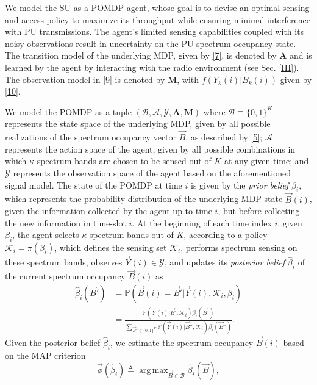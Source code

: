 \documentclass[10pt,twocolumn]{IEEEtran}
\DeclareMathOperator*{\argmax}{arg\,max}
\begin{document}
We model the SU as a POMDP agent, whose goal is to devise an optimal sensing and access policy to maximize its throughput while ensuring minimal interference with PU transmissions. The agent's limited sensing capabilities coupled with its noisy observations result in uncertainty on the PU spectrum occupancy state. The transition model of the underlying MDP, given by \eqref{7}, is denoted by $\mathbf{A}$ and is learned by the agent by interacting with the radio environment (see Sec. \ref{III}). The observation model in \eqref{9} is denoted by $\mathbf{M}$, with $f(Y_k(i)|B_k(i))$ given by \eqref{10}. 

We model the POMDP as a tuple $(\mathcal B,\mathcal{A},\mathcal{Y},\mathbf{A},\mathbf{M})$ where $\mathcal{B}{\equiv}\{0,1\}^K$ represents the state space of the underlying MDP, given by all possible realizations of the spectrum occupancy vector $\vec{B}$, as described by \eqref{5}; $\mathcal{A}$ represents the action space of the agent, given by all possible combinations in which $\kappa$ spectrum bands are chosen to be sensed out of $K$ at any given time; and $\mathcal{Y}$ represents the observation space of the agent based on the aforementioned signal model. The state of the POMDP at time $i$ is given by the \emph{prior belief} $\beta_i$, which represents the probability distribution of the underlying MDP state $\vec{B}(i)$, given the information collected by the agent up to time $i$, but before collecting the new information in time-slot $i$. At the beginning of each time index $i$, given $\beta_i$, the agent selects $\kappa$ spectrum bands out of $K$, according to a policy $\mathcal K_i{=}\pi(\beta_i)$, which defines the sensing set $\mathcal K_i$, performs spectrum sensing  on these spectrum bands, observes $\vec{Y}(i){\in} \mathcal{Y}$, and updates its \emph{posterior belief} $\hat{\beta}_i$ of the current spectrum occupancy $\vec{B}(i)$ as 
\begin{align}\label{11}
\nonumber
\hat\beta_i(\vec{B}') &= \mathbb{P}(\vec{B}(i) = \vec{B}'|\vec{Y}(i), \mathcal K_i, \beta_i)\\&=
\frac{\mathbb{P}(\vec{Y}(i)|\vec{B}', \mathcal{K}_i) \beta_i(\vec{B}')}{
\sum_{\vec{B}'' {\in} \{0,1\}^K} \mathbb{P}(\vec{Y}(i)|\vec{B}'', \mathcal{K}_i) \beta_i(\vec{B}'')}.
\end{align}
Given the posterior belief $\hat{\beta}_i$, we estimate the spectrum occupancy $\vec{B}(i)$
based on the MAP criterion
$$
\vec{\phi}(\hat{\beta}_{i})\triangleq \argmax_{\vec{B} {\in} \mathcal{B}} \hat{\beta}_{i}(\vec{B}),
$$
\end{document}
